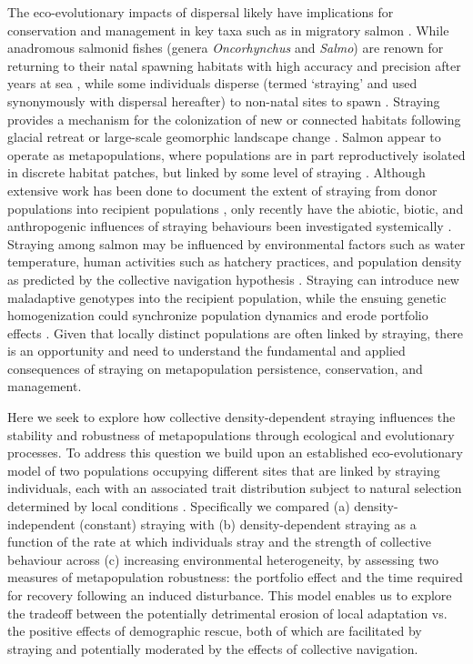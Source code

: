 \documentclass{revtex4}
\begin{document}
The eco-evolutionary impacts of dispersal likely have implications for conservation and management in key taxa such as in migratory salmon \citep{Brenner:2012gl,Johnson:2012fe,Fullerton:2011ii}.
While anadromous salmonid fishes (genera \emph{Oncorhynchus} and \emph{Salmo}) are renown for returning to their natal spawning habitats with high accuracy and precision after years at sea \citep{Quinn:2011tf,Jonsson:2011kg,Keefer:2014gg}, while some individuals disperse (termed `straying' and used synonymously with dispersal hereafter) to non-natal sites to spawn \citep{Quinn:1993ge,Hendry:2004wf}.
Straying provides a mechanism for the colonization of new or connected habitats following glacial retreat or large-scale geomorphic landscape change \citep{Hendry:2004wf}.
Salmon appear to operate as metapopulations, where populations are in part reproductively isolated in discrete habitat patches, but linked by some level of straying \citep{Schtickzelle:2007wb,Anderson:2014cx}.
Although extensive work has been done to document the extent of straying from donor populations into recipient populations \citep{Keefer:2014gg,Bett:2017ha}, only recently have the abiotic, biotic, and anthropogenic influences of straying behaviours been investigated systemically \citep{Keefer:2008bs,Westley:2015to,Bond:2016dz}.
Straying among salmon may be influenced by environmental factors such as water temperature, human activities such as hatchery practices, and population density as predicted by the collective navigation hypothesis \citep{Peterson:2014gy,Berdahl:2017uu}.
Straying can introduce new maladaptive genotypes into the recipient population, while the ensuing genetic homogenization could synchronize population dynamics and erode portfolio effects \citep{Moore:2010gs,Carlson:2011ce,Braun:2016ib}.
Given that locally distinct populations are often linked by straying, there is an opportunity and need to understand the fundamental and applied consequences of straying on metapopulation persistence, conservation, and management.

Here we seek to explore how collective density-dependent straying influences the stability and robustness of metapopulations through ecological and evolutionary processes.
To address this question we build upon an established eco-evolutionary model of two populations occupying different sites that are linked by straying individuals, each with an associated trait distribution subject to natural selection determined by local conditions \citep{Ronce:2001dp}.
Specifically we compared (a) density-independent (constant) straying with (b) density-dependent straying as a function of the rate at which individuals stray and the strength of collective behaviour across (c) increasing environmental heterogeneity, by assessing two measures of metapopulation robustness: the portfolio effect and the time required for recovery following an induced disturbance. 
This model enables us to explore the tradeoff between the potentially detrimental erosion of local adaptation vs. the positive effects of demographic rescue, both of which are facilitated by straying and potentially moderated by the effects of collective navigation. 
\end{document}
